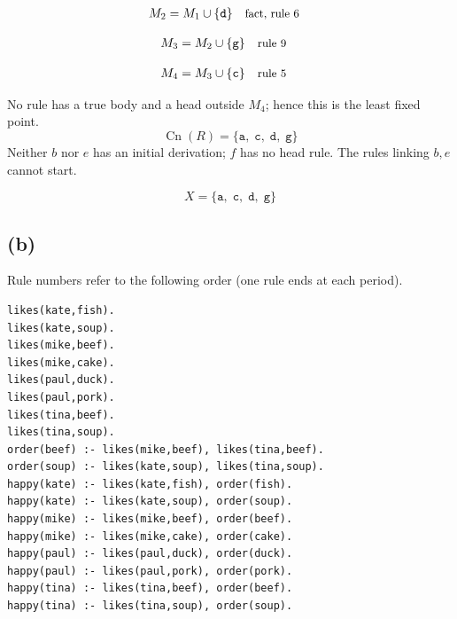 \documentclass[a4paper,11pt]{article}
\newif\ifexplain
\newcommand{\explain}[1]{\ifexplain\begin{erklbox}#1\end{erklbox}\fi}
\newcommand{\explainfig}[1]{\ifexplain\begin{center}#1\end{center}\fi}
\newcommand{\why}[1]{\text{\small #1}}
\newcommand{\teil}[1]{\subsection*{(#1)}}
\newcommand{\at}[1]{\texttt{#1}}
\begin{document}
\explain{Diese Regel hat keinen Körper. Ihr Kopf $\at{a}$ ist damit ein Fakt und muss in die Menge.}
\begin{align*}
M_{2} &= M_{1}\cup \{\at{d}\} && \why{fact, rule 6}
\end{align*}
\explain{Diese Regel hat keinen Körper. Ihr Kopf $\at{d}$ ist damit ein Fakt und muss in die Menge.}
\begin{align*}
M_{3} &= M_{2}\cup \{\at{g}\} && \why{rule 9}
\end{align*}
\explain{Für $\at{g}$ brauchen wir $\at{a}$ und $\at{d}$. Weil diese Voraussetzungen bereits hergeleitet sind, dürfen wir den Regelkopf jetzt aufnehmen und alle bisherigen Atome behalten; bei einer fehlenden Voraussetzung würde diese Regel dagegen noch nichts beitragen.}
\begin{align*}
M_{4} &= M_{3}\cup \{\at{c}\} && \why{rule 5}
\end{align*}
\explain{Für $\at{c}$ brauchen wir $\at{d}$ und $\at{g}$. Weil diese Voraussetzungen bereits hergeleitet sind, dürfen wir den Regelkopf jetzt aufnehmen und alle bisherigen Atome behalten; bei einer fehlenden Voraussetzung würde diese Regel dagegen noch nichts beitragen.}
No rule has a true body and a head outside $M_{4}$; hence this is the least fixed point.
\[
\operatorname{Cn}(R)=\{\at{a},\;\at{c},\;\at{d},\;\at{g}\}
\]
Neither $b$ nor $e$ has an initial derivation; $f$ has no head rule. The rules linking $b,e$ cannot start.
\explainfig{\begin{tikzpicture}[every node/.style={draw,rounded corners,minimum width=1.3cm}]\node (ad) at (0,0) {$a,d$};\node (g) at (3,0) {$g$};\node (c) at (6,0) {$c$};\draw[->] (ad)--(g);\draw[->] (g)--(c);\end{tikzpicture}}
\explain{Die Pfeile zeigen den Weg vom Faktpaar zur neuen Aussage. Für $g$ brauchen wir $a,d$; für $c$ danach noch $d$, das als Fakt bereits vorhanden ist. Der Kreis zwischen $b$ und $e$ liegt außerhalb dieses Herleitungswegs und bekommt keinen Start.}
\[
\boxed{X=\{\at{a},\;\at{c},\;\at{d},\;\at{g}\}}
\]
\explain{Die Probe besteht aus zwei Teilen: Jede aufgenommene Aussage hat oben eine passende Regel. Am Ende kann keine Regel ein weiteres Atom hinzufügen. Damit ist die Menge ein Modell und zugleich das kleinste Modell.}
\teil{b}
Rule numbers refer to the following order (one rule ends at each period).
\begin{small}
\begin{verbatim}
likes(kate,fish).
likes(kate,soup).
likes(mike,beef).
likes(mike,cake).
likes(paul,duck).
likes(paul,pork).
likes(tina,beef).
likes(tina,soup).
order(beef) :- likes(mike,beef), likes(tina,beef).
order(soup) :- likes(kate,soup), likes(tina,soup).
happy(kate) :- likes(kate,fish), order(fish).
happy(kate) :- likes(kate,soup), order(soup).
happy(mike) :- likes(mike,beef), order(beef).
happy(mike) :- likes(mike,cake), order(cake).
happy(paul) :- likes(paul,duck), order(duck).
happy(paul) :- likes(paul,pork), order(pork).
happy(tina) :- likes(tina,beef), order(beef).
happy(tina) :- likes(tina,soup), order(soup).
\end{verbatim}
\end{small}
\end{document}
